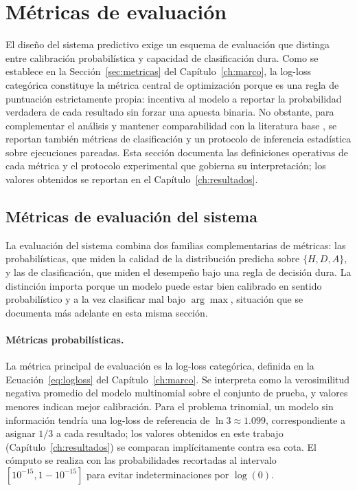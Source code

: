 
\section{M\'etricas de evaluaci\'on}
\label{sec:metricas_eval}

El dise\~no del sistema predictivo exige un esquema de evaluaci\'on que distinga entre calibraci\'on probabil\'istica y capacidad de clasificaci\'on dura. Como se establece en la Secci\'on~\ref{sec:metricas} del Cap\'itulo~\ref{ch:marco}, la log-loss categ\'orica constituye la m\'etrica central de optimizaci\'on porque es una regla de puntuaci\'on estrictamente propia: incentiva al modelo a reportar la probabilidad verdadera de cada resultado sin forzar una apuesta binaria. No obstante, para complementar el an\'alisis y mantener comparabilidad con la literatura base \cite{Glicko2Mod}, se reportan tambi\'en m\'etricas de clasificaci\'on y un protocolo de inferencia estad\'istica sobre ejecuciones pareadas. Esta secci\'on documenta las definiciones operativas de cada m\'etrica y el protocolo experimental que gobierna su interpretaci\'on; los valores obtenidos se reportan en el Cap\'itulo~\ref{ch:resultados}.

\subsection{M\'etricas de evaluaci\'on del sistema}
\label{subsec:metricas_prob}
\label{subsec:metricas_clas}

La evaluaci\'on del sistema combina dos familias complementarias de m\'etricas: las probabil\'isticas, que miden la calidad de la distribuci\'on predicha sobre $\{H, D, A\}$, y las de clasificaci\'on, que miden el desempe\~no bajo una regla de decisi\'on dura. La distinci\'on importa porque un modelo puede estar bien calibrado en sentido probabil\'istico y a la vez clasificar mal bajo $\arg\max$, situaci\'on que se documenta m\'as adelante en esta misma secci\'on.

\paragraph{M\'etricas probabil\'isticas.} La m\'etrica principal de evaluaci\'on es la log-loss categ\'orica, definida en la Ecuaci\'on~\eqref{eq:logloss} del Cap\'itulo~\ref{ch:marco}. Se interpreta como la verosimilitud negativa promedio del modelo multinomial sobre el conjunto de prueba, y valores menores indican mejor calibraci\'on. Para el problema trinomial, un modelo sin informaci\'on tendr\'ia una log-loss de referencia de $\ln 3 \approx 1.099$, correspondiente a asignar $1/3$ a cada resultado; los valores obtenidos en este trabajo (Cap\'itulo~\ref{ch:resultados}) se comparan impl\'icitamente contra esa cota. El c\'omputo se realiza con las probabilidades recortadas al intervalo $[10^{-15}, 1-10^{-15}]$ para evitar indeterminaciones por $\log(0)$.

